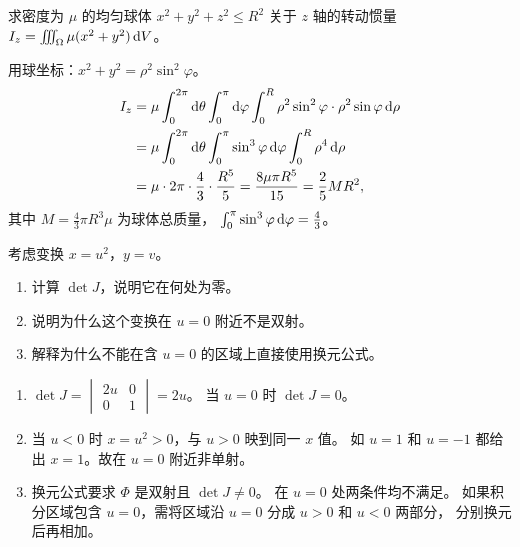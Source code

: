 \documentclass{ctexart}
\begin{document}
\begin{exercise}
  求密度为 $\mu$ 的均匀球体 $x^2+y^2+z^2 \le R^2$ 关于 $z$ 轴的转动惯量
  $I_z = \iiint_\Omega \mu(x^2+y^2) \,\mathrm{d} V$。
\end{exercise}

\begin{solution}
  用球坐标：$x^2+y^2 = \rho^2\sin^2\varphi$。
  \begin{align*}
    I_z &= \mu \int_0^{2\pi} \mathrm{d} \theta \int_0^\pi \mathrm{d} \varphi
          \int_0^R \rho^2\sin^2\varphi \cdot \rho^2\sin\varphi \,\mathrm{d} \rho \\
        &= \mu \int_0^{2\pi} \mathrm{d} \theta \int_0^\pi \sin^3\varphi \,\mathrm{d} \varphi
          \int_0^R \rho^4 \,\mathrm{d} \rho \\
        &= \mu \cdot 2\pi \cdot \frac{4}{3} \cdot \frac{R^5}{5}
         = \frac{8\mu\pi R^5}{15}
         = \frac{2}{5} M R^2,
  \end{align*}
  其中 $M = \frac{4}{3}\pi R^3\mu$ 为球体总质量，
  $\int_0^\pi \sin^3\varphi \,\mathrm{d}\varphi = \frac{4}{3}$。
\end{solution}

\begin{exercise}[雅可比为零的反例]
  考虑变换 $x = u^2$，$y = v$。
  \begin{enumerate}
    \item 计算 $\det J$，说明它在何处为零。
    \item 说明为什么这个变换在 $u = 0$ 附近不是双射。
    \item 解释为什么不能在含 $u = 0$ 的区域上直接使用换元公式。
  \end{enumerate}
\end{exercise}

\begin{solution}
  \begin{enumerate}
    \item $\det J = \begin{vmatrix} 2u & 0 \\ 0 & 1 \end{vmatrix} = 2u$。
      当 $u = 0$ 时 $\det J = 0$。
    \item 当 $u < 0$ 时 $x = u^2 > 0$，与 $u > 0$ 映到同一 $x$ 值。
      如 $u = 1$ 和 $u = -1$ 都给出 $x = 1$。故在 $u = 0$ 附近非单射。
    \item 换元公式要求 $\Phi$ 是双射且 $\det J \ne 0$。
      在 $u = 0$ 处两条件均不满足。
      如果积分区域包含 $u = 0$，需将区域沿 $u = 0$ 分成 $u > 0$ 和 $u < 0$ 两部分，
      分别换元后再相加。
  \end{enumerate}
\end{solution}
\end{document}
